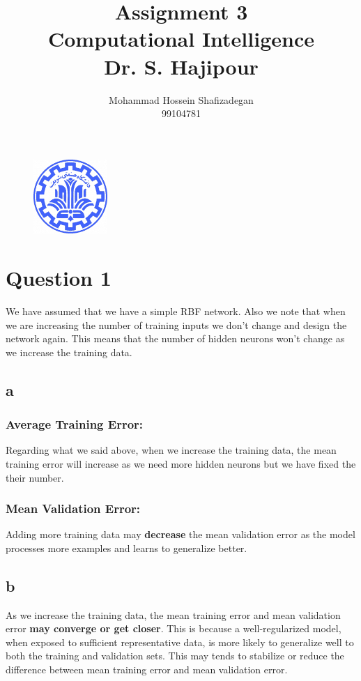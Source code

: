 \documentclass[]{article}
\author{
	Mohammad Hossein Shafizadegan\\
	99104781
}
\title{
	Assignment 3 \\
	Computational Intelligence  \\
	Dr. S. Hajipour
}
\begin{document}
	\begin{figure}
		\includegraphics[width=0.25\textwidth]{Fig/Sharif.png}
		\centering
	\end{figure}
	\maketitle
	\tableofcontents
	\newpage
	\section{Question 1}
	We have assumed that we have a simple RBF network. Also we note that when we are increasing the number of training inputs we don't change and design the network again. This means that the number of hidden neurons won't change as we increase the training data.
	\subsection*{a}
	\subsubsection*{Average Training Error:}
	Regarding what we said above, when we increase the training data, the mean training error will increase as we need more hidden neurons but we have fixed the their number.
	\subsubsection*{Mean Validation Error:}
	Adding more training data may \textbf{decrease} the mean validation error as the model processes more examples and learns to generalize better.
	
	\subsection*{b}
	As we increase the training data, the mean training error and mean validation error \textbf{may converge or get closer}. This is because a well-regularized model, when exposed to sufficient representative data, is more likely to generalize well to both the training and validation sets. This may tends to stabilize or reduce the difference between mean training error and mean validation error.
	
\end{document}
